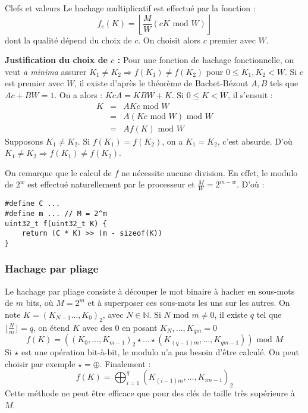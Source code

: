 \documentclass[../../../main.tex]{subfiles}
\begin{document}
\begin{definition}{Clefs et valeurs}
Le hachage multiplicatif est effectué par la fonction :
$$f_c(K) = \left\lfloor\dfrac{M}{W}(c K\text{ mod }W)\right\rfloor$$
dont la qualité dépend du choix de $c$. On choisit alors $c$ premier avec $W$.

\textbf{Justification du choix de $c$ :} Pour une fonction de hachage fonctionnelle, on veut \textit{a minima} assurer $K_1\neq K_2\Rightarrow f(K_1)\neq f(K_2)$ pour $0 \leq K_1, K_2 < W$. Si $c$ est premier avec $W$, il existe d'après le théorème de Bachet-Bézout $A, B$ tels que $Ac + BW = 1$. On a alors : $Kc A = KBW + K$.\newline
Si $0\leq K < W$, il s'ensuit :
$$\begin{array}{lcll}
K & = & AKc \text{ mod }W \\
  & = & A(Kc\text{ mod }W)\text{ mod }W \\
  & = & Af(K)\text{ mod } W\end{array}$$
Supposons $K_1\neq K_2$. Si $f(K_1) = f(K_2)$, on a $K_1 = K_2$, c'est absurde.\newline
D'où $K_1 \neq K_2 \Rightarrow f(K_1)\neq f(K_2)$.

On remarque que le calcul de $f$ ne nécessite aucune division. En effet, le modulo de $2^w$ est effectué naturellement par le processeur et $\frac{M}{W} = 2^{m-w}$. D'où :
\begin{verbatim}
#define C ...
#define m ... // M = 2^m
uint32_t f(uint32_t K) {
	return (C * K) >> (m - sizeof(K))
}
\end{verbatim}
\subsubsection{Hachage par pliage}
Le hachage par pliage consiste à découper le mot binaire à hacher en sous-mots de $m$ bits, où $M = 2^m$ et à superposer ces sous-mots les uns sur les autres. On note $K = (K_{N-1} \dots, K_0)_2$, avec $N\in\mathbb{N}$. Si $N\text{ mod }m \neq 0$, il existe $q$ tel que $\lfloor\frac{N}{m}\rfloor = q$, on étend $K$ avec des $0$ en posant $K_N, \dots, K_{qm} = 0$
$$f(K) = \left((K_0, \dots, K_{m-1})_2\star \dots \star (K_{(q-1)m}, \dots, K_{qm - 1})\right)\text{ mod }M$$
Si $\star$ est une opération bit-à-bit, le modulo n'a pas besoin d'être calculé. On peut choisir par exemple $\star = \oplus$. Finalement :
$$f(K) = \displaystyle\bigoplus_{i = 1}^{q}(K_{(i - 1)m}, \dots, K_{im - 1})_2$$
Cette méthode ne peut être efficace que pour des clés de taille très supérieure à $M$.

\end{definition}
\end{document}
